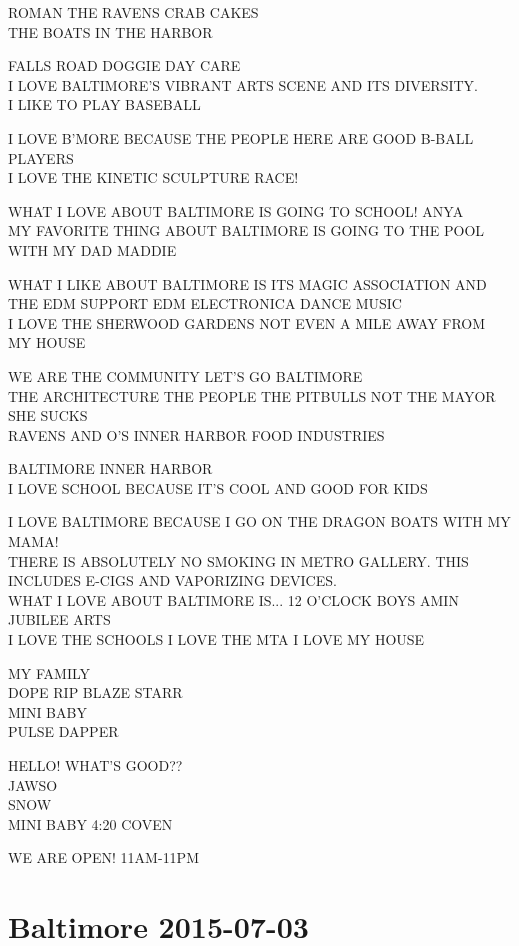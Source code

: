 \documentclass[10pt,letterpaper]{article}
\begin{document}
ROMAN THE RAVENS CRAB CAKES\\
THE BOATS IN THE HARBOR

FALLS ROAD DOGGIE DAY CARE\\
I LOVE BALTIMORE'S VIBRANT ARTS SCENE AND ITS DIVERSITY.\\
I LIKE TO PLAY BASEBALL

I LOVE B'MORE BECAUSE THE PEOPLE HERE ARE GOOD B{-}BALL PLAYERS\\
I LOVE THE KINETIC SCULPTURE RACE!

WHAT I LOVE ABOUT BALTIMORE IS GOING TO SCHOOL!  ANYA\\
MY FAVORITE THING ABOUT BALTIMORE IS GOING TO THE POOL WITH MY DAD MADDIE

WHAT I LIKE ABOUT BALTIMORE IS ITS MAGIC ASSOCIATION AND THE EDM SUPPORT EDM ELECTRONICA DANCE MUSIC\\
I LOVE THE SHERWOOD GARDENS NOT EVEN A MILE AWAY FROM MY HOUSE

WE ARE THE COMMUNITY LET'S GO BALTIMORE\\
THE ARCHITECTURE THE PEOPLE THE PITBULLS NOT THE MAYOR SHE SUCKS\\
RAVENS AND O'S INNER HARBOR FOOD INDUSTRIES

BALTIMORE INNER HARBOR\\
I LOVE SCHOOL BECAUSE IT'S COOL AND GOOD FOR KIDS

I LOVE BALTIMORE BECAUSE I GO ON THE DRAGON BOATS WITH MY MAMA!\\
THERE IS ABSOLUTELY NO SMOKING IN METRO GALLERY.  THIS INCLUDES E{-}CIGS AND VAPORIZING DEVICES.\\
WHAT I LOVE ABOUT BALTIMORE IS... 12 O'CLOCK BOYS AMIN JUBILEE ARTS\\
I LOVE THE SCHOOLS I LOVE THE MTA I LOVE MY HOUSE

MY FAMILY\\
DOPE RIP BLAZE STARR\\
MINI BABY\\
PULSE DAPPER

HELLO!  WHAT'S GOOD??\\
JAWSO\\
SNOW\\
MINI BABY 4:20 COVEN

WE ARE OPEN!  11AM{-}11PM
\pagebreak

\section*{Baltimore 2015-07-03}
\end{document}
